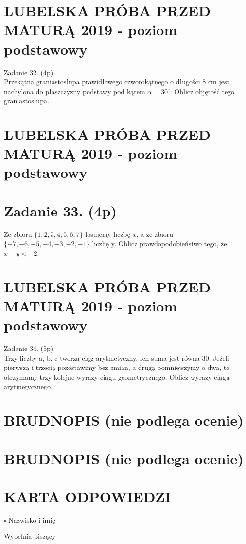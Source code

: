 \documentclass[10pt]{article}
\begin{document}
\section*{LUBELSKA PRÓBA PRZED MATURĄ 2019 - poziom podstawowy}
Zadanie 32. (4p)\\
Przekątna graniastosłupa prawidłowego czworokątnego o długości 8 cm jest nachylona do płaszczyzny podstawy pod kątem \(\alpha=30^{\circ}\). Oblicz objętość tego graniastosłupa.

\section*{LUBELSKA PRÓBA PRZED MATURĄ 2019 - poziom podstawowy}
\section*{Zadanie 33. (4p)}
Ze zbioru \(\{1,2,3,4,5,6,7\}\) losujemy liczbę \(x\), a ze zbioru \(\{-7,-6,-5,-4,-3,-2,-1\}\) liczbę y. Oblicz prawdopodobieństwo tego, że \(x+y<-2\).

\section*{LUBELSKA PRÓBA PRZED MATURĄ 2019 - poziom podstawowy}
Zadanie 34. (5p)\\
Trzy liczby a, b, c tworzą ciąg arytmetyczny. Ich suma jest równa 30. Jeżeli pierwszą i trzecią pozostawimy bez zmian, a drugą pomniejszymy o dwa, to otrzymamy trzy kolejne wyrazy ciągu geometrycznego. Oblicz wyrazy ciągu arytmetycznego.

\section*{BRUDNOPIS (nie podlega ocenie)}
\section*{BRUDNOPIS (nie podlega ocenie)}
\section*{KARTA ODPOWIEDZI}
\(\square\) Nazwisko i imię

Wypelnia piszący
\end{document}
